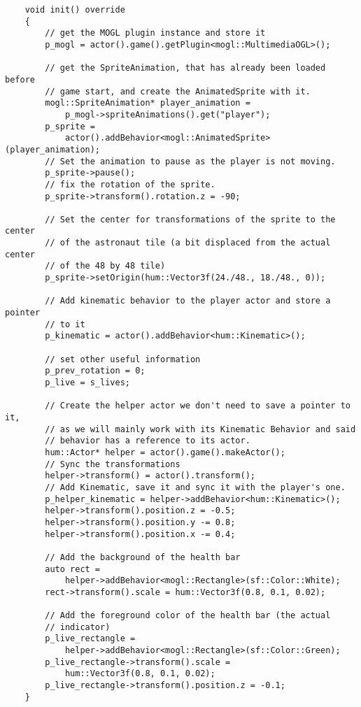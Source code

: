 \begin{lstlisting}
    void init() override
    {
        // get the MOGL plugin instance and store it
        p_mogl = actor().game().getPlugin<mogl::MultimediaOGL>();

        // get the SpriteAnimation, that has already been loaded before
        // game start, and create the AnimatedSprite with it.
        mogl::SpriteAnimation* player_animation =
            p_mogl->spriteAnimations().get("player");
        p_sprite =
            actor().addBehavior<mogl::AnimatedSprite>(player_animation);
        // Set the animation to pause as the player is not moving.
        p_sprite->pause();
        // fix the rotation of the sprite.
        p_sprite->transform().rotation.z = -90;

        // Set the center for transformations of the sprite to the center
        // of the astronaut tile (a bit displaced from the actual center
        // of the 48 by 48 tile)
        p_sprite->setOrigin(hum::Vector3f(24./48., 18./48., 0));

        // Add kinematic behavior to the player actor and store a pointer
        // to it
        p_kinematic = actor().addBehavior<hum::Kinematic>();

        // set other useful information
        p_prev_rotation = 0;
        p_live = s_lives;

        // Create the helper actor we don't need to save a pointer to it,
        // as we will mainly work with its Kinematic Behavior and said
        // behavior has a reference to its actor.
        hum::Actor* helper = actor().game().makeActor();
        // Sync the transformations
        helper->transform() = actor().transform();
        // Add Kinematic, save it and sync it with the player's one.
        p_helper_kinematic = helper->addBehavior<hum::Kinematic>();
        helper->transform().position.z = -0.5;
        helper->transform().position.y -= 0.8;
        helper->transform().position.x -= 0.4;

        // Add the background of the health bar
        auto rect =
            helper->addBehavior<mogl::Rectangle>(sf::Color::White);
        rect->transform().scale = hum::Vector3f(0.8, 0.1, 0.02);

        // Add the foreground color of the health bar (the actual
        // indicator)
        p_live_rectangle =
            helper->addBehavior<mogl::Rectangle>(sf::Color::Green);
        p_live_rectangle->transform().scale =
            hum::Vector3f(0.8, 0.1, 0.02);
        p_live_rectangle->transform().position.z = -0.1;
    }
\end{lstlisting}

